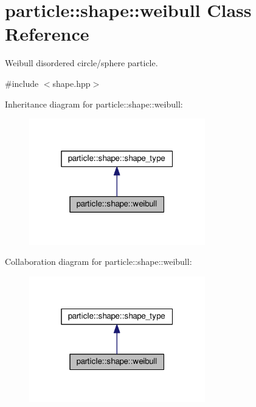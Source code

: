 \hypertarget{classparticle_1_1shape_1_1weibull}{}\section{particle\+:\+:shape\+:\+:weibull Class Reference}
\label{classparticle_1_1shape_1_1weibull}


Weibull disordered circle/sphere particle.  




{\ttfamily \#include $<$shape.\+hpp$>$}



Inheritance diagram for particle\+:\+:shape\+:\+:weibull\+:\nopagebreak
\begin{figure}[H]
\begin{center}
\leavevmode
\includegraphics[width=217pt]{dc/d64/classparticle_1_1shape_1_1weibull__inherit__graph}
\end{center}
\end{figure}


Collaboration diagram for particle\+:\+:shape\+:\+:weibull\+:\nopagebreak
\begin{figure}[H]
\begin{center}
\leavevmode
\includegraphics[width=217pt]{dd/d57/classparticle_1_1shape_1_1weibull__coll__graph}
\end{center}
\end{figure}
